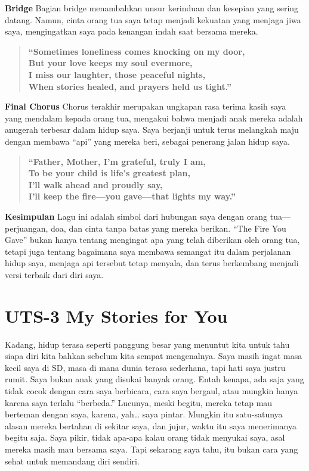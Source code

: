 \documentclass[
  letterpaper,
  DIV=11,
  numbers=noendperiod]{scrreprt}
\begin{document}
\textbf{Bridge} Bagian bridge menambahkan unsur kerinduan dan kesepian
yang sering datang. Namun, cinta orang tua saya tetap menjadi kekuatan
yang menjaga jiwa saya, mengingatkan saya pada kenangan indah saat
bersama mereka.

\begin{quote}
\textbf{``Sometimes loneliness comes knocking on my door,\\
But your love keeps my soul evermore,\\
I miss our laughter, those peaceful nights,\\
When stories healed, and prayers held us tight.''}
\end{quote}

\textbf{Final Chorus} Chorus terakhir merupakan ungkapan rasa terima
kasih saya yang mendalam kepada orang tua, mengakui bahwa menjadi anak
mereka adalah anugerah terbesar dalam hidup saya. Saya berjanji untuk
terus melangkah maju dengan membawa ``api'' yang mereka beri, sebagai
penerang jalan hidup saya.

\begin{quote}
\textbf{``Father, Mother, I'm grateful, truly I am,\\
To be your child is life's greatest plan,\\
I'll walk ahead and proudly say,\\
I'll keep the fire---you gave---that lights my way.''}
\end{quote}

\textbf{Kesimpulan} Lagu ini adalah simbol dari hubungan saya dengan
orang tua---perjuangan, doa, dan cinta tanpa batas yang mereka berikan.
``The Fire You Gave'' bukan hanya tentang mengingat apa yang telah
diberikan oleh orang tua, tetapi juga tentang bagaimana saya membawa
semangat itu dalam perjalanan hidup saya, menjaga api tersebut tetap
menyala, dan terus berkembang menjadi versi terbaik dari diri saya.


\chapter{UTS-3 My Stories for You}\label{uts-3-my-stories-for-you}

Kadang, hidup terasa seperti panggung besar yang menuntut kita untuk
tahu siapa diri kita bahkan sebelum kita sempat mengenalnya. Saya masih
ingat masa kecil saya di SD, masa di mana dunia terasa sederhana, tapi
hati saya justru rumit. Saya bukan anak yang disukai banyak orang. Entah
kenapa, ada saja yang tidak cocok dengan cara saya berbicara, cara saya
bergaul, atau mungkin hanya karena saya terlalu ``berbeda.'' Lucunya,
meski begitu, mereka tetap mau berteman dengan saya, karena, yah\ldots{}
saya pintar. Mungkin itu satu-satunya alasan mereka bertahan di sekitar
saya, dan jujur, waktu itu saya menerimanya begitu saja. Saya pikir,
tidak apa-apa kalau orang tidak menyukai saya, asal mereka masih mau
bersama saya. Tapi sekarang saya tahu, itu bukan cara yang sehat untuk
memandang diri sendiri.
\end{document}

